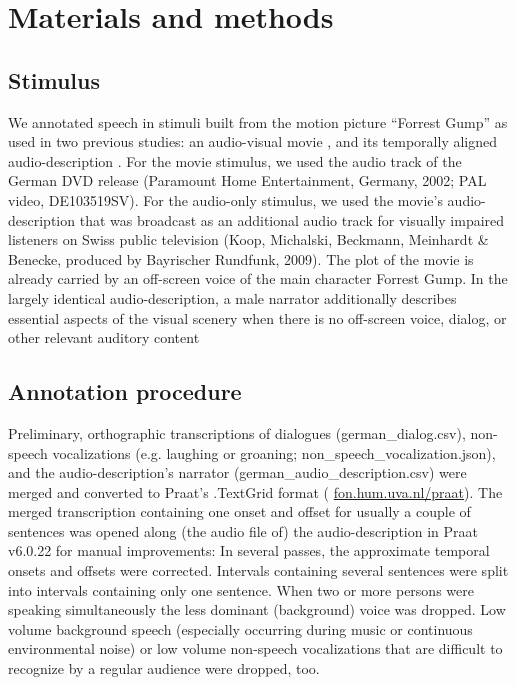 \documentclass[10pt,a4paper,onecolumn]{article}
\begin{document}
\section*{Materials and methods}
\subsection*{Stimulus}
We annotated speech in stimuli built from the motion picture ``Forrest Gump'' as
used in two previous studies: an audio-visual movie
\citep{hanke2016simultaneous}, and its temporally aligned audio-description
\citep{hanke2014audiomovie}. For the movie stimulus, we used the audio track of
the German DVD release (Paramount Home Entertainment, Germany, 2002; PAL video,
DE103519SV)\citep{ForrestGumpDVD}. For the audio-only stimulus, we used the
movie's audio-description that was broadcast as an additional audio track for
visually impaired listeners on Swiss public television (Koop, Michalski,
Beckmann, Meinhardt \& Benecke, produced by Bayrischer Rundfunk,
2009)\citep{ForrestGumpGermanAD}. The plot of the movie is already carried by an
off-screen voice of the main character Forrest Gump. In the largely identical audio-description, a male narrator additionally describes essential aspects of the visual scenery when there is no off-screen voice, dialog, or other relevant auditory content
\subsection*{Annotation procedure}
Preliminary, orthographic transcriptions of dialogues (german\_dialog.csv),
non-speech vocalizations (e.g. laughing or groaning;
non\_speech\_vocalization.json), and the audio-description's narrator
(german\_audio\_description.csv) were merged and converted to Praat's
\citep{boersma2019praat} .TextGrid format (
\href{www.fon.hum.uva.nl/praat}{fon.hum.uva.nl/praat}). The merged transcription
containing one onset and offset for usually a couple of sentences was opened
along (the audio file of) the audio-description in Praat v6.0.22 for manual
improvements: In several passes, the approximate temporal onsets and offsets
were corrected. Intervals containing several sentences were split into intervals
containing only one sentence. When two or more persons were speaking
simultaneously the less dominant (background) voice was dropped. Low volume
background speech (especially occurring during music or continuous environmental
noise) or low volume non-speech vocalizations that are difficult to recognize by
a regular audience were dropped, too.
\end{document}
